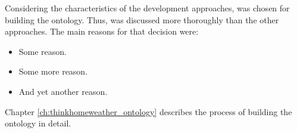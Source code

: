 
Considering the characteristics of the development approaches, \methontology was chosen for building the \thinkhomeweather ontology. Thus, \methontology was discussed more thoroughly than the other approaches. The main reasons for that decision were:

\begin{itemize}
  \item Some reason.
  \item Some more reason.
  \item And yet another reason.
\end{itemize}

Chapter \ref{ch:thinkhomeweather_ontology} describes the process of building the \thinkhomeweather ontology in detail.